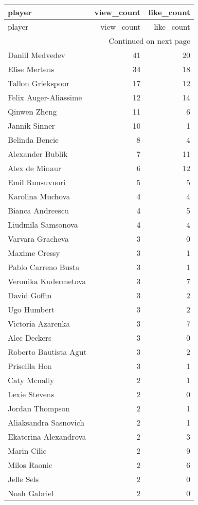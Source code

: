 
\usepackage{longtable}
\usepackage{booktabs}
\begin{longtable}{lrr}
\toprule
player & view_count & like_count \\
\midrule
\endfirsthead
\toprule
player & view_count & like_count \\
\midrule
\endhead
\midrule
\multicolumn{3}{r}{Continued on next page} \\
\midrule
\endfoot
\bottomrule
\endlastfoot
Daniil Medvedev & 41 & 20 \\
Elise Mertens & 34 & 18 \\
Tallon Griekspoor & 17 & 12 \\
Felix Auger-Aliassime & 12 & 14 \\
Qinwen Zheng & 11 & 6 \\
Jannik Sinner & 10 & 1 \\
Belinda Bencic & 8 & 4 \\
Alexander Bublik & 7 & 11 \\
Alex de Minaur & 6 & 12 \\
Emil Ruusuvuori & 5 & 5 \\
Karolina Muchova & 4 & 4 \\
Bianca Andreescu & 4 & 5 \\
Liudmila Samsonova & 4 & 4 \\
Varvara Gracheva & 3 & 0 \\
Maxime Cressy & 3 & 1 \\
Pablo Carreno Busta & 3 & 1 \\
Veronika Kudermetova & 3 & 7 \\
David Goffin & 3 & 2 \\
Ugo Humbert & 3 & 2 \\
Victoria Azarenka & 3 & 7 \\
Alec Deckers & 3 & 0 \\
Roberto Bautista Agut & 3 & 2 \\
Priscilla Hon & 3 & 1 \\
Caty Mcnally & 2 & 1 \\
Lexie Stevens & 2 & 0 \\
Jordan Thompson & 2 & 1 \\
Aliaksandra Sasnovich & 2 & 1 \\
Ekaterina Alexandrova & 2 & 3 \\
Marin Cilic & 2 & 9 \\
Milos Raonic & 2 & 6 \\
Jelle Sels & 2 & 0 \\
Noah Gabriel & 2 & 0 \\

\end{longtable}
